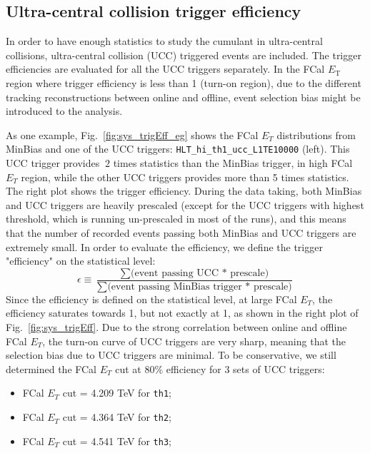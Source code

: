 \subsection{Ultra-central collision trigger efficiency}
In order to have enough statistics to study the cumulant in ultra-central collisions, ultra-central collision (UCC) triggered events are included. The trigger efficiencies are evaluated for all the UCC triggers separately. In the FCal $E_\text{T}$ region where trigger efficiency is less than 1 (turn-on region), due to the different tracking reconstructions between online and offline, event selection bias might be introduced to the analysis.

As one example, Fig.~\ref{fig:sys_trigEff_eg} shows the FCal $E_{T}$ distributions from MinBias and one of the UCC triggers: \verb|HLT_hi_|\verb|th1_ucc_L1TE10000| (left). This UCC trigger provides $~2$ times statistics than the MinBias trigger, in high FCal $E_{T}$ region, while the other UCC triggers provides more than 5 times statistics. The right plot shows the trigger efficiency. During the data taking, both MinBias and UCC triggers are heavily prescaled (except for the UCC triggers with highest threshold, which is running un-prescaled in most of the runs), and this means that the number of recorded events passing both MinBias and UCC triggers are extremely small. In order to evaluate the efficiency, we define the trigger "efficiency" on the statistical level:
\begin{equation}
\epsilon\equiv \frac{\sum\text{(event passing UCC * prescale)}}{\sum\text{(event passing MinBias trigger * prescale)}}
\end{equation}
Since the efficiency is defined on the statistical level, at large FCal $E_{T}$, the efficiency saturates towards 1, but not exactly at 1, as shown in the right plot of Fig.~\ref{fig:sys_trigEff}. Due to the strong correlation between online and offline FCal $E_{T}$, the turn-on curve of UCC triggers are very sharp, meaning that the selection bias due to UCC triggers are minimal. To be conservative, we still determined the FCal $E_{T}$ cut at $80\%$ efficiency for 3 sets of UCC triggers:
\begin{itemize}
\item FCal $E_{T}$ cut = 4.209 TeV for \verb|th1|;
\item FCal $E_{T}$ cut = 4.364 TeV for \verb|th2|;
\item FCal $E_{T}$ cut = 4.541 TeV for \verb|th3|;
\end{itemize}
